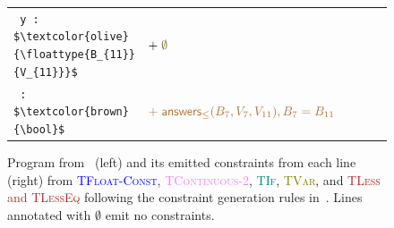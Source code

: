 \begin{figure}[t]
{\begin{tabular}{p{0.35\linewidth} p{0.7\linewidth}}
    \lstinline[style=mystyle]| y : $\textcolor{olive}{\floattype{B_{11}}{V_{11}}}$| 
      & $+\; \textcolor{olive}{\emptyset}$  \\

    \lstinline[style=mystyle]| : $\textcolor{brown}{\bool}$| 
      & $\textcolor{brown}{+\; \answersleq{B_7}{V_7}{V_{11}}, B_7 = B_{11}}$ \\
    
    \end{tabular}
}
    
    \caption{Program from~ (left) and its emitted constraints from each line (right) from \textcolor{blue}{\textsc{TFloat-Const}}, \textcolor{violet}{\textsc{TContinuous-2}}, \textcolor{teal}{\textsc{TIf}}, \textcolor{olive}{\textsc{TVar}}, and \textcolor{brown}{\textsc{TLess} and \textsc{TLessEq}} following the constraint generation rules in~. Lines annotated with $\emptyset$ emit no constraints.}
    \label{fig:constraint-generation}
\end{figure}
